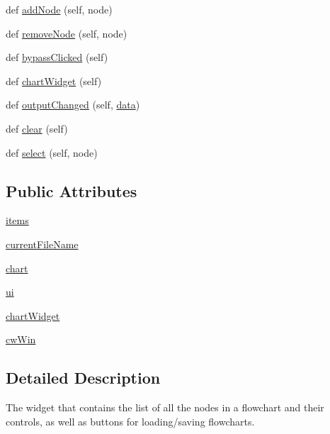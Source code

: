 \begin{DoxyCompactItemize}
\item 
def \hyperlink{classFlowchart_1_1FlowchartCtrlWidget_ad09dda7c32d7256004859ea2f7b57743}{add\+Node} (self, node)
\item 
def \hyperlink{classFlowchart_1_1FlowchartCtrlWidget_a2e07438204133625695d7927b0fb1b96}{remove\+Node} (self, node)
\item 
def \hyperlink{classFlowchart_1_1FlowchartCtrlWidget_ab14bd127c66b447c88c6c05987d5ea9c}{bypass\+Clicked} (self)
\item 
def \hyperlink{classFlowchart_1_1FlowchartCtrlWidget_af3fbc7363343ab958ab596b8dbd003bf}{chart\+Widget} (self)
\item 
def \hyperlink{classFlowchart_1_1FlowchartCtrlWidget_a609a3566fdb62fd17978d278edc3a6a4}{output\+Changed} (self, \hyperlink{namespaceFlowchart_a7d5fda16f35dc91fa5fde9e7bb08e1e5}{data})
\item 
def \hyperlink{classFlowchart_1_1FlowchartCtrlWidget_a2cedc3bc9e9db64a52ca67de55cf8b3a}{clear} (self)
\item 
def \hyperlink{classFlowchart_1_1FlowchartCtrlWidget_a453c88015204f9755a5b9a0ca2d88f20}{select} (self, node)
\end{DoxyCompactItemize}
\subsection*{Public Attributes}
\begin{DoxyCompactItemize}
\item 
\hyperlink{classFlowchart_1_1FlowchartCtrlWidget_a2b2cce03df58e42726668ccbea738d16}{items}
\item 
\hyperlink{classFlowchart_1_1FlowchartCtrlWidget_ad00c939c1c39f4803560ba5e9e0933a2}{current\+File\+Name}
\item 
\hyperlink{classFlowchart_1_1FlowchartCtrlWidget_a78d9548db343b8db6cf06ebd0ea8e2f4}{chart}
\item 
\hyperlink{classFlowchart_1_1FlowchartCtrlWidget_a2f16540e34be423bf6c5633d28cce2b2}{ui}
\item 
\hyperlink{classFlowchart_1_1FlowchartCtrlWidget_adb097ecb8f7ef517b9f699309d0962a4}{chart\+Widget}
\item 
\hyperlink{classFlowchart_1_1FlowchartCtrlWidget_a10c44d866b65330f80b248d4dc546be2}{cw\+Win}
\end{DoxyCompactItemize}


\subsection{Detailed Description}
\begin{DoxyVerb}The widget that contains the list of all the nodes in a flowchart and their controls, as well as buttons for loading/saving flowcharts.\end{DoxyVerb}
 

